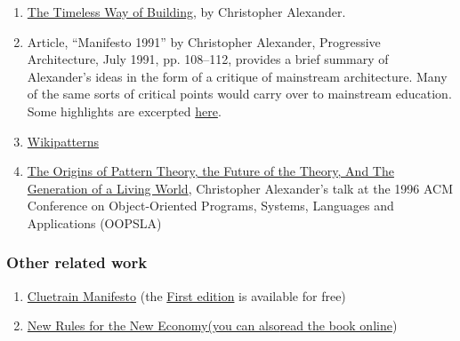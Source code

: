 \begin{enumerate}
\item
  \href{http://en.wikipedia.org/wiki/The\_Timeless\_Way\_of\_Building}{The
  Timeless Way of Building}, by Christopher Alexander.
\item
  Article, ``Manifesto 1991'' by Christopher Alexander, Progressive
  Architecture, July 1991, pp. 108--112, provides a brief summary of
  Alexander's ideas in the form of a critique of mainstream
  architecture. Many of the same sorts of critical points would carry
  over to mainstream education. Some highlights are excerpted
  \href{https://plus.google.com/u/0/108598104736826154120/posts/agWYcqPhqSN}{here}.
\item
  \href{http://www.wikipatterns.com/display/wikipatterns/About}{Wikipatterns}
\item
  \href{http://www.patternlanguage.com/archive/ieee/ieeetext.htm}{The
  Origins of Pattern Theory, the Future of the Theory, And The
  Generation of a Living World}, Christopher Alexander's talk at the
  1996 ACM Conference on Object-Oriented Programs, Systems, Languages
  and Applications (OOPSLA)
\end{enumerate}
\subsubsection{Other related work}

\begin{enumerate}
\item
  \href{http://www.cluetrain.com}{Cluetrain Manifesto} (the
  \href{http://www.cluetrain.com/book/index.html}{First edition} is
  available for free)
\item
  \href{http://www.kk.org/newrules/contents.php}{New Rules for the New
  Economy}\href{http://www.kk.org/newrules/contents.php}{(you can
  also}\href{http://www.kk.org/newrules/contents.php}{read the book
  online})
\end{enumerate}
